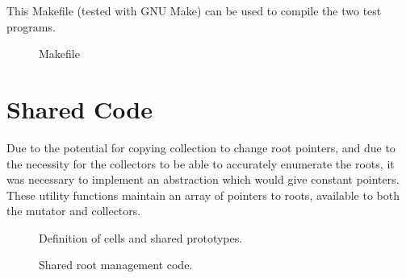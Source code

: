 This Makefile (tested with GNU Make) can be used to compile the two
test programs.


\begin{figure}[H]
  \captionsetup{format=default}
  \caption{Makefile}
  \label{fig:makefile}
\end{figure}

\section{Shared Code}
\label{sec:gc-impl-shared}

Due to the potential for copying collection to change root pointers,
and due to the necessity for the collectors to be able to accurately
enumerate the roots, it was necessary to implement an abstraction
which would give constant pointers. These utility functions maintain
an array of pointers to roots, available to both the mutator and
collectors.

\vspace{1cm}


\begin{figure}[H]
  \captionsetup{format=default}
  \caption{Definition of cells and shared prototypes.}
  \label{fig:shared-h}
\end{figure}


\begin{figure}[H]
  \captionsetup{format=default}
  \caption{Shared root management code.}
  \label{fig:shared-c}
\end{figure}
